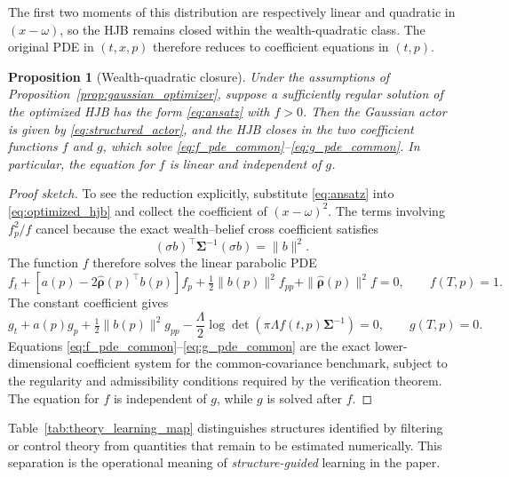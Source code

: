 \documentclass[a4paper,10pt]{article}
\newtheorem{proposition}{Proposition}
\newcommand{\bSigma}{\bm{\Sigma}}
\newcommand{\brho}{\bm{\rho}}
\begin{document}
The first two moments of this distribution are respectively linear and quadratic in $(x-\omega)$, so the HJB remains closed within the wealth-quadratic class. The original PDE in $(t,x,p)$ therefore reduces to coefficient equations in $(t,p)$.

\begin{proposition}[Wealth-quadratic closure]
\label{prop:quadratic_closure}
Under the assumptions of Proposition~\ref{prop:gaussian_optimizer}, suppose a sufficiently regular solution of the optimized HJB has the form \eqref{eq:ansatz} with $f>0$. Then the Gaussian actor is given by \eqref{eq:structured_actor}, and the HJB closes in the two coefficient functions $f$ and $g$, which solve \eqref{eq:f_pde_common}--\eqref{eq:g_pde_common}. In particular, the equation for $f$ is linear and independent of $g$.
\end{proposition}

\begin{proof}[Proof sketch]
To see the reduction explicitly, substitute \eqref{eq:ansatz} into \eqref{eq:optimized_hjb} and collect the coefficient of $(x-\omega)^2$. The terms involving $f_p^2/f$ cancel because the exact wealth--belief cross coefficient satisfies
\begin{equation}
(\sigma b)^\top\bSigma^{-1}(\sigma b)=\|b\|^2.
\end{equation}
The function $f$ therefore solves the linear parabolic PDE
\begin{equation}
f_t
+\left[a(p)-2\widehat{\brho}(p)^\top b(p)\right]f_p
+\tfrac12\|b(p)\|^2f_{pp}
+\|\widehat{\brho}(p)\|^2f=0,
\qquad f(T,p)=1.
\label{eq:f_pde_common}
\end{equation}
The constant coefficient gives
\begin{equation}
g_t+a(p)g_p+\tfrac12\|b(p)\|^2g_{pp}
-\frac{\Lambda}{2}
\log\det\left(\pi\Lambda f(t,p)\bSigma^{-1}\right)=0,
\qquad g(T,p)=0.
\label{eq:g_pde_common}
\end{equation}
Equations \eqref{eq:f_pde_common}--\eqref{eq:g_pde_common} are the exact lower-dimensional coefficient system for the common-covariance benchmark, subject to the regularity and admissibility conditions required by the verification theorem. The equation for $f$ is independent of $g$, while $g$ is solved after $f$.
\end{proof}

Table~\ref{tab:theory_learning_map} distinguishes structures identified by filtering or control theory from quantities that remain to be estimated numerically. This separation is the operational meaning of \emph{structure-guided} learning in the paper.
\end{document}

